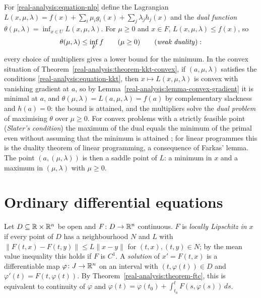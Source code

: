 \begin{remark}[Duality]\label{real-analysis:remark-lagrange-duality}
For \eqref{real-analysis:equation-nlp} define the Lagrangian $L(x, \mu, \lambda) = f(x) + \sum_i\mu_ig_i(x) + \sum_j\lambda_jh_j(x)$ and the \emph{dual function} $\theta(\mu, \lambda) = \inf_{x \in U}L(x, \mu, \lambda)$.
For $\mu \geq 0$ and $x \in F$, $L(x, \mu, \lambda) \leq f(x)$, so
\[
\theta(\mu, \lambda) \leq \inf_Ff \qquad (\mu \geq 0) \qquad \text{(\emph{weak duality})}:
\]
every choice of multipliers gives a lower bound for the minimum. In the convex situation of Theorem~\ref{real-analysis:theorem-kkt-convex}, if $(a, \mu, \lambda)$ satisfies the conditions
\eqref{real-analysis:equation-kkt}, then $x \mapsto L(x, \mu, \lambda)$ is convex with vanishing gradient at $a$, so by Lemma~\ref{real-analysis:lemma-convex-gradient} it is minimal at $a$, and
$\theta(\mu, \lambda) = L(a, \mu, \lambda) = f(a)$ by complementary slackness and $h(a) = 0$: the bound is attained, and the multipliers solve the \emph{dual problem} of maximising $\theta$ over $\mu \geq 0$. For convex problems
with a strictly feasible point (\emph{Slater's condition}) the maximum of the dual equals the minimum of the primal even without assuming that the minimum is attained \cite[Chapter 5]{boyd-vandenberghe};
for linear programmes this is the duality theorem of linear programming, a consequence of Farkas' lemma. The point $(a, (\mu, \lambda))$ is then a saddle point of $L$: a minimum in $x$ and a
maximum in $(\mu, \lambda)$ with $\mu \geq 0$.
\end{remark}

\section{Ordinary differential equations}\label{real-analysis:section-ode}

\begin{definition}\label{real-analysis:definition-ode}
Let $D \subseteq \mathbb{R} \times \mathbb{R}^n$ be open and $F \colon D \to \mathbb{R}^n$ continuous. $F$ is \emph{locally Lipschitz in $x$} if every point of $D$ has a neighbourhood $N$ and $L$ with
$\|F(t, x) - F(t, y)\| \leq L\|x - y\|$ for $(t, x), (t, y) \in N$; by the mean value inequality this holds if $F$ is $C^1$. A \emph{solution} of $x' = F(t, x)$ is a differentiable map $\varphi \colon J \to \mathbb{R}^n$
on an interval with $(t, \varphi(t)) \in D$ and $\varphi'(t) = F(t, \varphi(t))$. By Theorem~\ref{real-analysis:theorem-ftc}, this is equivalent to continuity of $\varphi$ and
$\varphi(t) = \varphi(t_0) + \int_{t_0}^tF(s, \varphi(s))\,ds$.
\end{definition}

